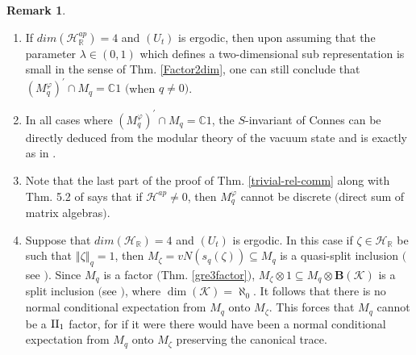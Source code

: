 \documentclass[12pt, a4paper,reqno]{amsart}
\theoremstyle{definition}
\newtheorem{Remark}[Theorem]{Remark}
\def\C{\mathbb C}
\def\R{\mathbb R}
\newcommand{\CH}{\mathcal{H}}
\newcommand{\norm}[1]{\left\Vert#1\right\Vert}
\begin{document}
\begin{Remark}\label{cent}
$ $
\begin{enumerate}
\item If $dim(\CH_\R^{ap})=4$ and $(U_t)$ is ergodic, then upon assuming that the parameter $\lambda\in(0,1)$ which defines a two-dimensional sub representation is small in the sense of Thm. \ref{Factor2dim}, one can still conclude that $(M_q^\varphi)^\prime\cap M_q=\C1$ $($when $q\neq 0)$. 
%
\item In all cases where $(M_q^\varphi)^\prime\cap M_q=\C1$, the $S$-invariant of Connes can be directly deduced from the modular theory of the vacuum state and is exactly as in \cite[Thm. 8.2]{bik-kunal}. 
%
\item Note that the last part of the proof of Thm. \ref{trivial-rel-comm} along with Thm. 5.2 of \cite{DM2} says that if $\CH^{ap}\neq 0$, then $M_q^{\varphi}$ cannot be discrete $($direct sum of matrix algebras$)$. 
%
\item Suppose that $dim(\CH_\R)=4$ and $(U_t)$ is ergodic. In this case if $\zeta\in \CH_\R$ be such that $\norm{\zeta}_q=1$, then $M_\zeta=vN(s_q(\zeta))\subseteq M_q$ is a quasi-split inclusion $($see \cite[Thm. 4.6]{BM2}$)$. Since $M_q$ is a factor $($Thm. \ref{gre3factor}$)$, $M_\zeta\otimes 1\subseteq M_q\otimes \mathbf{B}(\mathcal{K})$ is a split inclusion $($see \cite[Thm. 3.8]{BM2}$)$, where $\dim(\mathcal{K})=\aleph_0$. It follows that there is no normal conditional expectation from $M_q$ onto $M_\zeta$. This forces that $M_q$ cannot be a $\rm{II}_1$ factor, for if it were there would have been a normal conditional expectation from $M_q$ onto $M_\zeta$ preserving the canonical trace.
\end{enumerate}
\end{Remark}


%
%
\end{document}
